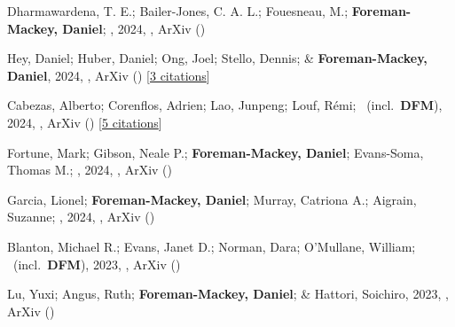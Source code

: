 \item[{\color{numcolor}\scriptsize104}] Dharmawardena, T. E.; Bailer-Jones, C. A. L.; Fouesneau, M.; \textbf{Foreman-Mackey, Daniel}; \etal, 2024, , ArXiv ()

\item[{\color{numcolor}\scriptsize103}] Hey, Daniel; Huber, Daniel; Ong, Joel; Stello, Dennis; \& \textbf{Foreman-Mackey, Daniel}, 2024, , ArXiv () [\href{https://ui.adsabs.harvard.edu/abs/2024arXiv240302489H}{3 citations}]

\item[{\color{numcolor}\scriptsize102}] Cabezas, Alberto; Corenflos, Adrien; Lao, Junpeng; Louf, R{\'e}mi; \etal\ (incl.\ \textbf{DFM}), 2024, , ArXiv () [\href{https://ui.adsabs.harvard.edu/abs/2024arXiv240210797C}{5 citations}]

\item[{\color{numcolor}\scriptsize101}] Fortune, Mark; Gibson, Neale P.; \textbf{Foreman-Mackey, Daniel}; Evans-Soma, Thomas M.; \etal, 2024, , ArXiv ()

\item[{\color{numcolor}\scriptsize100}] Garcia, Lionel; \textbf{Foreman-Mackey, Daniel}; Murray, Catriona A.; Aigrain, Suzanne; \etal, 2024, , ArXiv ()

\item[{\color{numcolor}\scriptsize99}] Blanton, Michael R.; Evans, Janet D.; Norman, Dara; O'Mullane, William; \etal\ (incl.\ \textbf{DFM}), 2023, , ArXiv ()

\item[{\color{numcolor}\scriptsize98}] Lu, Yuxi; Angus, Ruth; \textbf{Foreman-Mackey, Daniel}; \& Hattori, Soichiro, 2023, , ArXiv ()

